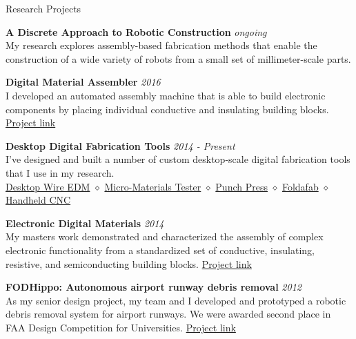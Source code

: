 \documentclass{resume} %
\begin{document}
\begin{rSection}{Research Projects}

{\bf A Discrete Approach to Robotic Construction} \hfill {\em ongoing}
\\My research explores assembly-based fabrication methods that enable the construction of a wide variety of robots from a small set of millimeter-scale parts.

{\bf Digital Material Assembler} \hfill {\em 2016}
\\I developed an automated assembly machine that is able to build electronic components by placing individual conductive and insulating building blocks. \href{http://www.willlangford.xyz/stapler/index.html}{Project link}

{\bf Desktop Digital Fabrication Tools} \hfill {\em 2014 - Present}
\\I've designed and built a number of custom desktop-scale digital fabrication tools that I use in my research.
\\\href{https://langfordw.pages.cba.mit.edu/desktopWEDM}{Desktop Wire EDM} $\diamond$
\href{http://www.willlangford.xyz/tabletopInstron/index.html}{Micro-Materials Tester} $\diamond$
\href{http://fab.cba.mit.edu/classes/865.15/people/will.langford/9_processors/index.html}{Punch Press} $\diamond$
\href{http://www.willlangford.xyz/foldafab/index.html}{Foldafab} $\diamond$
\href{http://www.willlangford.xyz/handheld_cnc/index.html}{Handheld CNC}

{\bf Electronic Digital Materials} \hfill {\em 2014}
\\My masters work demonstrated and characterized the assembly of complex electronic functionality from a standardized set of conductive, insulating, resistive, and semiconducting building blocks. \href{http://www.willlangford.xyz/electronic_digital_materials/index.html}{Project link}

{\bf FODHippo: Autonomous airport runway debris removal} \hfill {\em 2012}
\\As my senior design project, my team and I developed and prototyped a robotic debris removal system for airport runways. We were awarded second place in FAA Design Competition for Universities. \href{http://www.willlangford.xyz/hippo/index.html}{Project link}



\end{rSection}
\end{document}
